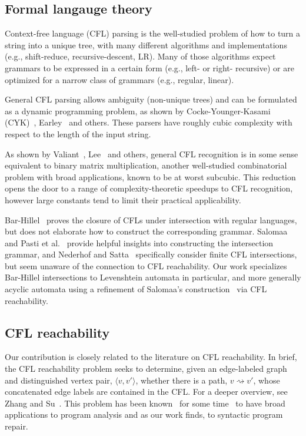 \documentclass[sigplan,review,acmsmall,nonacm,screen,anonymous]{acmart}\settopmatter{printfolios=false,printccs=false,printacmref=false}
\begin{document}
\subsection{Formal langauge theory}

Context-free language (CFL) parsing is the well-studied problem of how to turn a string into a unique tree, with many different algorithms and implementations (e.g., shift-reduce, recursive-descent, LR). Many of those algorithms expect grammars to be expressed in a certain form (e.g., left- or right- recursive) or are optimized for a narrow class of grammars (e.g., regular, linear).

General CFL parsing allows ambiguity (non-unique trees) and can be formulated as a dynamic programming problem, as shown by Cocke-Younger-Kasami (CYK)~\cite{sakai1961syntax}, Earley~\cite{earley1970efficient} and others. These parsers have roughly cubic complexity with respect to the length of the input string.

As shown by Valiant~\cite{valiant1975general}, Lee~\cite{lee2002fast} and others, general CFL recognition is in some sense equivalent to binary matrix multiplication, another well-studied combinatorial problem with broad applications, known to be at worst subcubic. This reduction opens the door to a range of complexity-theoretic speedups to CFL recognition, however large constants tend to limit their practical applicability.

Bar-Hillel~\cite{bar1961formal} proves the closure of CFLs under intersection with regular languages, but does not elaborate how to construct the corresponding grammar. Salomaa~\cite{salomaa1973formal} and Pasti et al.~\cite{pasti2023intersection} provide helpful insights into constructing the intersection grammar, and Nederhof and Satta~\cite{nederhof2004language} specifically consider finite CFL intersections, but seem unaware of the connection to CFL reachability. Our work specializes Bar-Hillel intersections to Levenshtein automata in particular, and more generally acyclic automata using a refinement of Salomaa's construction~\cite{salomaa1973formal} via CFL reachability.

\subsection{CFL reachability}

Our contribution is closely related to the literature on CFL reachability. In brief, the CFL reachability problem seeks to determine, given an edge-labeled graph and distinguished vertex pair, $\langle v, v' \rangle$, whether there is a path, $v \rightsquigarrow v'$, whose concatenated edge labels are contained in the CFL. For a deeper overview, see Zhang and Su~\cite{zhang2017context}. This problem has been known~\cite{reps1998program} for some time~\cite{kodumal2004set} to have broad applications to program analysis and as our work finds, to syntactic program repair.
\end{document}
